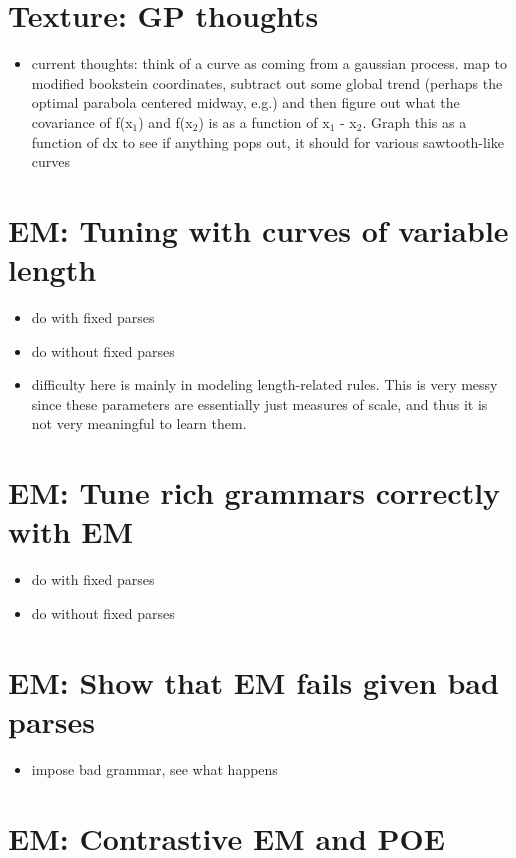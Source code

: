 \documentclass{book}
\begin{document}
\section{Texture: GP thoughts}
\label{sec-7_21}


\begin{itemize}
\item current thoughts: think of a curve as coming from a gaussian
    process. map to modified bookstein coordinates, subtract out some
    global trend (perhaps the optimal parabola centered midway, e.g.)
    and then figure out what the covariance of f(x$_1$) and f(x$_2$) is as
    a function of x$_1$ - x$_2$. Graph this as a function of dx to see if
    anything pops out, it should for various sawtooth-like curves
\end{itemize}
\section{EM: Tuning with curves of variable length}
\label{sec-7_22}

\begin{itemize}
\item do with fixed parses
\item do without fixed parses
\item difficulty here is mainly in modeling length-related rules. This
    is very messy since these parameters are essentially just measures
    of scale, and thus it is not very meaningful to learn them.
\end{itemize}
\section{EM: Tune rich grammars correctly with EM}
\label{sec-7_23}

\begin{itemize}
\item do with fixed parses
\item do without fixed parses
\end{itemize}
\section{EM: Show that EM fails given bad parses}
\label{sec-7_24}

\begin{itemize}
\item impose bad grammar, see what happens
\end{itemize}
\section{EM: Contrastive EM and POE}
\label{sec-7_25}
\end{document}
